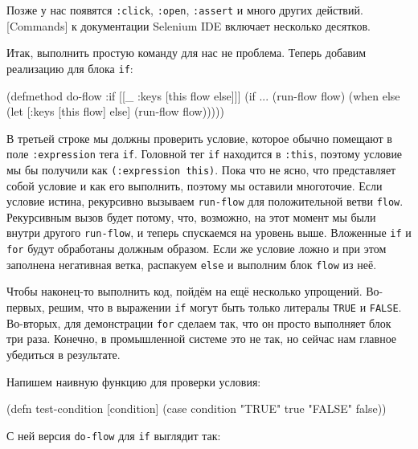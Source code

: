 Позже у нас появятся \texttt{:click}, \texttt{:open}, \texttt{:assert} и много
других действий.  [Commands]
к документации Selenium IDE включает несколько десятков.

Итак, выполнить простую команду для нас не проблема. Теперь добавим реализацию
для блока \texttt{if}:

\begin{english}
  \begin{clojure/lines}
(defmethod do-flow :if
  [[_ {:keys [this flow else]}]]
  (if ...
    (run-flow flow)
    (when else
      (let [{:keys [this flow]} else]
        (run-flow flow)))))
  \end{clojure/lines}
\end{english}

В третьей строке мы должны проверить условие, которое обычно помещают в поле
\texttt{:expression} тега \texttt{if}. Головной тег \texttt{if} находится в
\texttt{:this}, поэтому условие мы бы получили как \texttt{(:expression this)}.
Пока что не ясно, что представляет собой условие и как его выполнить, поэтому мы
оставили многоточие. Если условие истина, рекурсивно вызываем \texttt{run-flow}
для положительной ветви \texttt{flow}. Рекурсивным вызов будет потому, что,
возможно, на этот момент мы были внутри другого \verb|run-flow|, и теперь
спускаемся на уровень выше. Вложенные \texttt{if} и \texttt{for} будут
обработаны должным образом. Если же условие ложно и при этом заполнена
негативная ветка, распакуем \verb|else| и выполним блок \texttt{flow} из неё.

Чтобы наконец-то выполнить код, пойдём на ещё несколько упрощений. Во-первых,
решим, что в выражении \texttt{if} могут быть только литералы \texttt{TRUE} и
\texttt{FALSE}. Во-вторых, для демонстрации \texttt{for} сделаем так, что он
просто выполняет блок три раза. Конечно, в промышленной системе это не так, но
сейчас нам главное убедиться в результате.

Напишем наивную функцию для проверки условия:

\begin{english}
  \begin{clojure}
(defn test-condition [condition]
  (case condition
    "TRUE" true
    "FALSE" false))
  \end{clojure}
\end{english}

С ней версия \texttt{do-flow} для \texttt{if} выглядит так:

